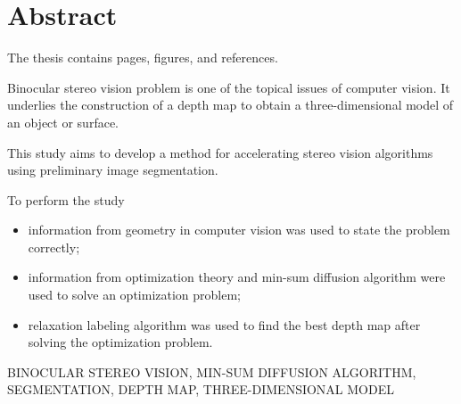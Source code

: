 \chapter*{Abstract}

The thesis contains \pageref{LastPage} pages,
 figures, and
 references.

Binocular stereo vision problem is one of the topical issues
of computer vision.
It underlies the construction of a depth map to obtain a three-dimensional model
of an object or surface.

This study aims to develop a method
for accelerating stereo vision algorithms using preliminary image segmentation.

To perform the study
\begin{itemize}
  \item information from geometry
        in computer vision was used to state the problem correctly;
  \item information from optimization theory and
        min-sum diffusion algorithm were used to solve an optimization problem;
  \item relaxation labeling algorithm was used to find the best depth map after
        solving the optimization problem.
\end{itemize}

\MakeUppercase{binocular stereo vision,
               min-sum diffusion algorithm,
               segmentation,
               depth map,
               three-dimensional model}
